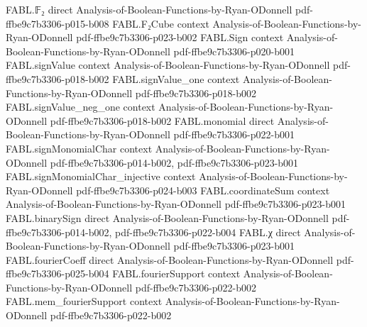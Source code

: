 \begin{theorem}
\label{FABL.functionAlgebraicDegree_booleanDerivative_anfMonomial_le}
\leanok
{}
\proofstep
  {FABL.𝔽₂}
  {direct}
  {Analysis-of-Boolean-Functions-by-Ryan-ODonnell}
  {pdf-ffbe9c7b3306-p015-b008}
\proofstep
  {FABL.F₂Cube}
  {context}
  {Analysis-of-Boolean-Functions-by-Ryan-ODonnell}
  {pdf-ffbe9c7b3306-p023-b002}
\proofstep
  {FABL.Sign}
  {context}
  {Analysis-of-Boolean-Functions-by-Ryan-ODonnell}
  {pdf-ffbe9c7b3306-p020-b001}
\proofstep
  {FABL.signValue}
  {context}
  {Analysis-of-Boolean-Functions-by-Ryan-ODonnell}
  {pdf-ffbe9c7b3306-p018-b002}
\proofstep
  {FABL.signValue_one}
  {context}
  {Analysis-of-Boolean-Functions-by-Ryan-ODonnell}
  {pdf-ffbe9c7b3306-p018-b002}
\proofstep
  {FABL.signValue_neg_one}
  {context}
  {Analysis-of-Boolean-Functions-by-Ryan-ODonnell}
  {pdf-ffbe9c7b3306-p018-b002}
\proofstep
  {FABL.monomial}
  {direct}
  {Analysis-of-Boolean-Functions-by-Ryan-ODonnell}
  {pdf-ffbe9c7b3306-p022-b001}
\proofstep
  {FABL.signMonomialChar}
  {context}
  {Analysis-of-Boolean-Functions-by-Ryan-ODonnell}
  {pdf-ffbe9c7b3306-p014-b002,
    pdf-ffbe9c7b3306-p023-b001}
\proofstep
  {FABL.signMonomialChar_injective}
  {context}
  {Analysis-of-Boolean-Functions-by-Ryan-ODonnell}
  {pdf-ffbe9c7b3306-p024-b003}
\proofstep
  {FABL.coordinateSum}
  {context}
  {Analysis-of-Boolean-Functions-by-Ryan-ODonnell}
  {pdf-ffbe9c7b3306-p023-b001}
\proofstep
  {FABL.binarySign}
  {direct}
  {Analysis-of-Boolean-Functions-by-Ryan-ODonnell}
  {pdf-ffbe9c7b3306-p014-b002,
    pdf-ffbe9c7b3306-p022-b004}
\proofstep
  {FABL.χ}
  {direct}
  {Analysis-of-Boolean-Functions-by-Ryan-ODonnell}
  {pdf-ffbe9c7b3306-p023-b001}
\proofstep
  {FABL.fourierCoeff}
  {direct}
  {Analysis-of-Boolean-Functions-by-Ryan-ODonnell}
  {pdf-ffbe9c7b3306-p025-b004}
\proofstep
  {FABL.fourierSupport}
  {context}
  {Analysis-of-Boolean-Functions-by-Ryan-ODonnell}
  {pdf-ffbe9c7b3306-p022-b002}
\proofstep
  {FABL.mem_fourierSupport}
  {context}
  {Analysis-of-Boolean-Functions-by-Ryan-ODonnell}
  {pdf-ffbe9c7b3306-p022-b002}
\proofstep

\end{theorem}
